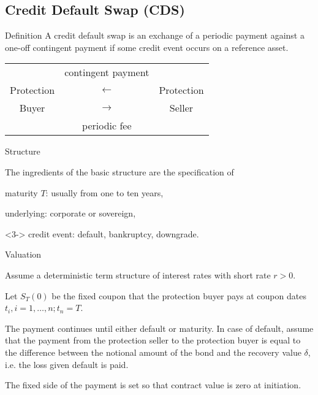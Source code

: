 \subsection{Credit Default Swap (CDS)}

{Definition}
A credit default swap is an exchange of a periodic payment against
a one-off contingent payment if some credit event occurs on a
reference asset.

\begin{table}[htb]
\begin{center}
\begin{tabular}{ccc}
& {\small contingent payment} & \\
Protection& $\longleftarrow $ & Protection\\
Buyer & $\longrightarrow $& Seller\\
& {\small periodic fee} &
\end{tabular}
\end{center}
\end{table}

{Structure}

The ingredients of the basic structure are the specification of






	maturity $T$: usually from one to ten years,


	
underlying: corporate or sovereign,

	<3-> credit event:
default, bankruptcy, downgrade.





{Valuation}







	Assume a deterministic term structure of interest rates with short rate $r>0$.


	Let $S_T(0)$ be the fixed coupon that the protection buyer pays at coupon dates
$t_i, i=1,\ldots, n; t_n=T$.


	The
payment continues until either default or maturity. In case of
default, assume that the payment from the protection seller to the
protection buyer is equal to the difference between the notional
amount of the bond and the recovery value $\delta$, i.e. the loss given default is paid.


	The fixed side
of the payment is set so that contract value is zero at
initiation.



